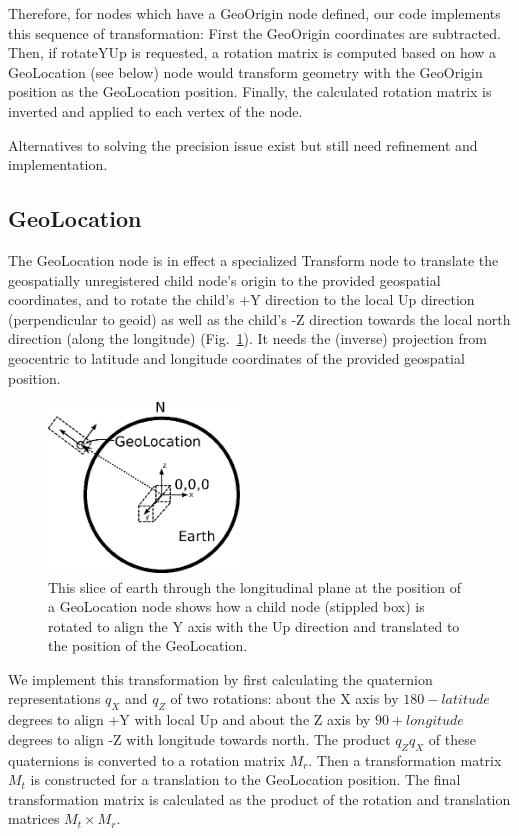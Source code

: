 \documentclass{acmsiggraph}                     %
\begin{document}
Therefore, for nodes which have a GeoOrigin node defined, our code implements this sequence of
transformation: First the GeoOrigin coordinates are subtracted. Then, if rotateYUp is requested, a
rotation matrix is computed based on how a GeoLocation (see below) node would transform geometry
with the GeoOrigin position as the GeoLocation position. Finally, the calculated rotation matrix is
inverted and applied to each vertex of the node.

Alternatives to solving the precision issue exist \cite{mccann09} but still
need refinement and implementation.


\subsection{GeoLocation}

The GeoLocation node is in effect a specialized Transform node to translate the geospatially
unregistered child node's origin to the provided geospatial coordinates, and to rotate the child's
+Y direction to the local Up direction (perpendicular to geoid) as well as the child's -Z direction
towards the local north direction (along the longitude) (Fig.~\ref{fig:GeoLocationDiagram}). It
needs the (inverse) projection from geocentric to latitude and longitude coordinates of the provided
geospatial position.

\begin{figure}[htbp] \centering \includegraphics[width=2.0in]{GeoLocationDiagram.png} \caption{This
  slice of earth through the longitudinal plane at the position of a GeoLocation node shows how a
child node (stippled box) is rotated to align the Y axis with the Up direction and translated to the
position of the GeoLocation.} \label{fig:GeoLocationDiagram} \end{figure}

We implement this transformation by first calculating the quaternion representations $q_X$ and $q_Z$
of two rotations: about the X axis by $180 - latitude$ degrees to align +Y with local Up and about
the Z axis by $90 + longitude$ degrees to align -Z with longitude towards north. The product
$q_{Z}q_{X}$ of these quaternions is converted to a rotation matrix $M_r$. Then a transformation
matrix $M_t$ is constructed for a translation to the GeoLocation position. The final transformation
matrix is calculated as the product of the rotation and translation matrices $M_t \times M_r$.
\end{document}
